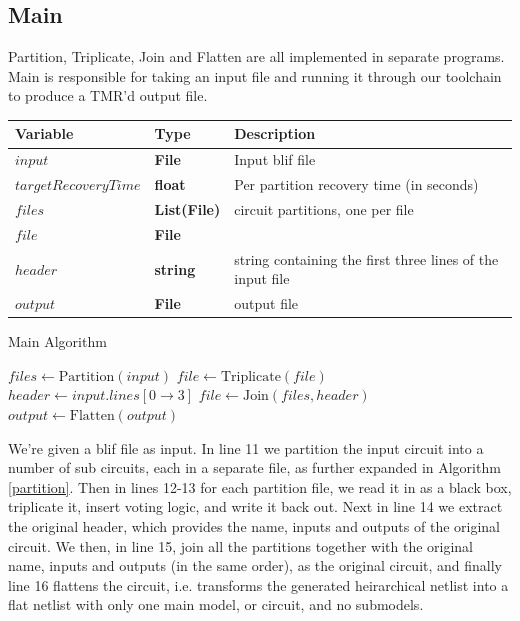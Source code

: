 \documentclass[12pt,final,oneside]{article} %
\begin{document}
\subsection{Main}
Partition, Triplicate, Join and Flatten are all implemented in separate programs. Main is responsible for taking an input file and running it through our toolchain to produce a TMR'd output file.
\begin{algorithm}
    \begin{center}
        \begin{tabular}{lll}
        \toprule
        Variable & Type & Description\\
        \midrule
        $input$ & \bf{File} & Input blif file\\
        $targetRecoveryTime$ & \bf{float} & Per partition recovery time (in seconds) \\
        $files$ & \bf{List(File)} & circuit partitions, one per file \\
        $file$ & \bf{File} & \\
        $header$ & \bf{string} & string containing the first three lines of the input file \\
        $output$ & \bf{File} & output file\\
        \bottomrule
        \end{tabular}
    \end{center}
   \caption{Main Algorithm}\label{main}
   \begin{algorithmic}[1]
         \State $files \gets \mbox{Partition}(input)$
            \State $file \gets \mbox{Triplicate}(file)$
         \EndFor
         \State $header \gets input.lines[0\to 3]$
         \State $file \gets \mbox{Join}(files, header)$
         \State $output \gets \mbox{Flatten}(output)$
      \EndProcedure
   \end{algorithmic}
\end{algorithm}
We're given a blif file as input.
In line 11 we partition the input circuit into a number of sub circuits, each in a separate file, as further expanded in Algorithm \ref{partition}.
Then in lines 12-13 for each partition file, we read it in as a black box, triplicate it, insert voting logic, and write it back out.
Next in line 14 we extract the original header, which provides the name, inputs and outputs of the original circuit.
We then, in line 15, join all the partitions together with the original name, inputs and outputs (in the same order), as the original circuit, and finally line 16 flattens the circuit, i.e. transforms the generated heirarchical netlist into a flat netlist with only one main model, or circuit, and no submodels.
\end{document}
